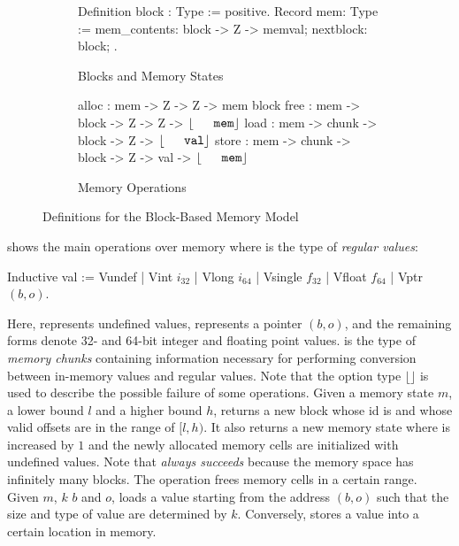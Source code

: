 \begin{figure}
  \begin{subfigure}[b]{.45\textwidth}
    \begin{coq}
Definition block : Type := positive.
Record mem: Type := { 
  mem_contents: block -> Z -> memval;
  nextblock: block; }.
    \end{coq}
    \caption{Blocks and Memory States}
    \label{sfig:memstate}
  \end{subfigure}
  \begin{subfigure}[b]{.5\textwidth}  
    \begin{coq}
alloc : mem -> Z -> Z -> mem \times block
free  : mem -> block -> Z -> Z -> $\some{\code{mem}}$
load  : mem -> chunk -> block -> Z -> $\some{\code{val}}$
store : mem -> chunk -> block -> Z -> val -> $\some{\code{mem}}$
    \end{coq}
    \caption{Memory Operations}
    \label{sfig:memops}
  \end{subfigure}
  \caption{Definitions for the Block-Based Memory Model}
  \label{fig:bbmem}
\end{figure}

 shows the main operations over memory where
 is the type of \emph{regular values}:
%
\begin{coq}
   Inductive val := Vundef | Vint $i_{32}$ | Vlong $i_{64}$ | Vsingle $f_{32}$ | Vfloat $f_{64}$ | Vptr $(b,o)$.
\end{coq}
%
Here,  represents undefined values, 
represents a pointer $(b,o)$, and the remaining forms denote 32- and
64-bit integer and floating point values.
%
 is the type of \emph{memory chunks} containing
information necessary for performing conversion between in-memory
values and regular values.
%
Note that the option type $\lfloor \rfloor$ is used to describe the
possible failure of some operations.  Given a memory state $m$, a
lower bound $l$ and a higher bound $h$, 
returns a new block whose id is  and whose valid
offsets are in the range of $[l,h)$. It also returns a new memory state
  where \nextblock is increased by $1$ and the newly allocated memory
  cells are initialized with undefined values.
%
Note that  \emph{always succeeds} because the memory space
has infinitely many blocks. The  operation frees memory
cells in a certain range. Given $m$, $k$ $b$ and $o$,
loads a value starting from the address $(b,o)$ such
that the size and type of value are determined by $k$.  Conversely,
 stores a value into a certain location in memory.

